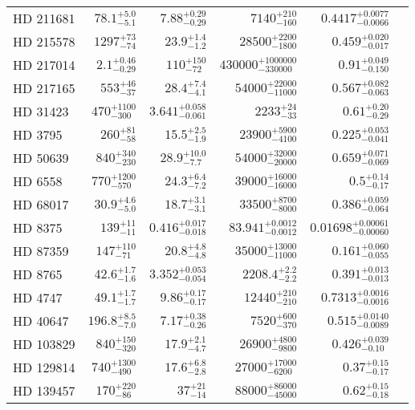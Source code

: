 \begin{longtable*}{lrrrrr}
HD 211681 & $78.1^{+5.0}_{-5.1}$ & $7.88^{+0.29}_{-0.29}$ & $7140^{+210}_{-160}$ & $0.4417^{+0.0077}_{-0.0066}$ \\ 
HD 215578 & $1297^{+73}_{-74}$ & $23.9^{+1.4}_{-1.2}$ & $28500^{+2200}_{-1800}$ & $0.459^{+0.020}_{-0.017}$ \\ 
HD 217014 & $2.1^{+0.46}_{-0.29}$ & $110^{+150}_{-72}$ & $430000^{+1000000}_{-330000}$ & $0.91^{+0.049}_{-0.150}$ \\ 
HD 217165 & $553^{+46}_{-37}$ & $28.4^{+7.4}_{-4.1}$ & $54000^{+22000}_{-11000}$ & $0.567^{+0.082}_{-0.063}$ \\ 
HD 31423 & $470^{+1100}_{-300}$ & $3.641^{+0.058}_{-0.061}$ & $2233^{+24}_{-33}$ & $0.61^{+0.20}_{-0.29}$ \\ 
HD 3795 & $260^{+81}_{-58}$ & $15.5^{+2.5}_{-1.9}$ & $23900^{+5900}_{-4100}$ & $0.225^{+0.053}_{-0.041}$ \\ 
HD 50639 & $840^{+340}_{-230}$ & $28.9^{+10.0}_{-7.7}$ & $54000^{+32000}_{-20000}$ & $0.659^{+0.071}_{-0.069}$ \\ 
HD 6558 & $770^{+1200}_{-570}$ & $24.3^{+6.4}_{-7.2}$ & $39000^{+16000}_{-16000}$ & $0.5^{+0.14}_{-0.17}$ \\ 
HD 68017 & $30.9^{+4.6}_{-5.0}$ & $18.7^{+3.1}_{-3.1}$ & $33500^{+8700}_{-8000}$ & $0.386^{+0.059}_{-0.064}$ \\ 
HD 8375 & $139^{+11}_{-11}$ & $0.416^{+0.017}_{-0.018}$ & $83.941^{+0.0012}_{-0.0012}$ & $0.01698^{+0.00061}_{-0.00060}$ \\ 
HD 87359 & $147^{+110}_{-71}$ & $20.8^{+4.8}_{-4.8}$ & $35000^{+13000}_{-11000}$ & $0.161^{+0.060}_{-0.055}$ \\ 
HD 8765 & $42.6^{+1.7}_{-1.6}$ & $3.352^{+0.053}_{-0.054}$ & $2208.4^{+2.2}_{-2.2}$ & $0.391^{+0.013}_{-0.013}$ \\ 
HD 4747 & $49.1^{+1.7}_{-1.7}$ & $9.86^{+0.17}_{-0.17}$ & $12440^{+210}_{-210}$ & $0.7313^{+0.0016}_{-0.0016}$ \\ 
HD 40647 & $196.8^{+8.5}_{-7.0}$ & $7.17^{+0.38}_{-0.26}$ & $7520^{+600}_{-370}$ & $0.515^{+0.0140}_{-0.0089}$ \\ 
HD 103829 & $840^{+150}_{-320}$ & $17.9^{+2.1}_{-4.7}$ & $26900^{+4800}_{-9800}$ & $0.426^{+0.039}_{-0.10}$ \\ 
HD 129814 & $740^{+1300}_{-490}$ & $17.6^{+6.8}_{-2.8}$ & $27000^{+17000}_{-6200}$ & $0.37^{+0.15}_{-0.17}$ \\ 
HD 139457 & $170^{+220}_{-86}$ & $37^{+21}_{-14}$ & $88000^{+86000}_{-45000}$ & $0.62^{+0.15}_{-0.18}$ \\ 

\end{longtable*}
